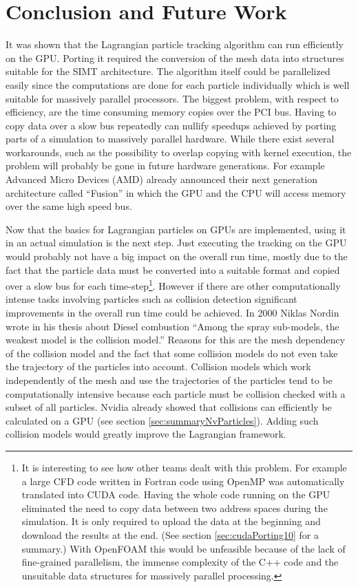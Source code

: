 \section{Conclusion and Future Work}

It was shown that the Lagrangian particle tracking algorithm can run efficiently on the GPU. Porting it required the conversion of the mesh data into structures suitable for the SIMT architecture. The algorithm itself could be parallelized easily since the computations are done for each particle individually which is well suitable for massively parallel processors. The biggest problem, with respect to efficiency, are the time consuming memory copies over the PCI bus. Having to copy data over a slow bus repeatedly can nullify speedups achieved by porting parts of a simulation to massively parallel hardware. While there exist several workarounds, such as the possibility to overlap copying with kernel execution, the problem will probably be gone in future hardware generations. For example Advanced Micro Devices (AMD) already announced their next generation architecture called ``Fusion'' \cite{fusionWhitepaper} in which the GPU and the CPU will access memory over the same high speed bus.

Now that the basics for Lagrangian particles on GPUs are implemented, using it in an actual simulation is the next step. Just executing the tracking on the GPU would probably not have a big impact on the overall run time, mostly due to the fact that the particle data must be converted into a suitable format and copied over a slow bus for each time-step\footnote{It is interesting to see how other teams dealt with this problem. For example a large CFD code written in Fortran code using OpenMP was automatically translated into CUDA code. Having the whole code running on the GPU eliminated the need to copy data between two address spaces during the simulation. It is only required to upload the data at the beginning and download the results at the end. \cite{portingCuda10} (See section \ref{sec:cudaPorting10} for a summary.) With OpenFOAM this would be unfeasible because of the lack of fine-grained parallelism, the immense complexity of the C++ code and the unsuitable data structures for massively parallel processing.}. However if there are other computationally intense tasks involving particles such as collision detection significant improvements in the overall run time could be achieved. In 2000 Niklas Nordin wrote in his thesis about Diesel combustion \cite[Chapter 2.2.6]{nordin00} ``Among the spray sub-models, the weakest model is the collision model.'' Reasons for this are the mesh dependency of the collision model and the fact that some collision models do not even take the trajectory of the particles into account. Collision models which work independently of the mesh and use the trajectories of the particles tend to be computationally intensive because each particle must be collision checked with a subset of all particles. Nvidia already showed that collisions can efficiently be calculated on a GPU (see section \ref{sec:summaryNvParticles}). Adding such collision models would greatly improve the Lagrangian framework.